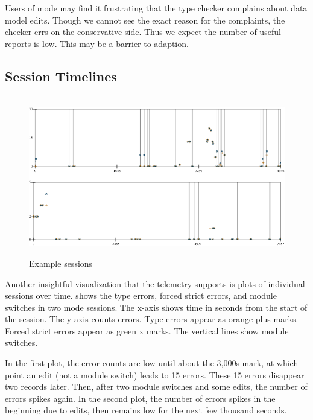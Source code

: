 \documentclass[english,submission,cleveref]{programming}
\begin{document}
Users of \mstrict{} mode may find it frustrating that the type checker complains
about data model edits.
Though we cannot see the exact reason for the complaints, the checker errs on
the conservative side.
Thus we expect the number of useful reports is low.
This may be a barrier to adaption.


\subsection{Session Timelines}

\begin{figure}[t]\centering

  \medskip{}
  \mstrict{}\\
  \includegraphics[width=\columnwidth]{img/timeline-strict.pdf}

  \caption{Example sessions}
  \label{f:indy-session}
\end{figure}

Another insightful visualization that the telemetry supports is plots of individual sessions
over time.
 shows the type errors, forced strict errors, and module switches
in two \mstrict{} mode sessions.
The x-axis shows time in seconds from the start of the session.
The y-axis counts errors.
Type errors appear as orange plus marks.
Forced strict errors appear as green x marks.
The vertical lines show module switches.

In the first plot, the error counts are low until about the 3,000s mark,
at which point an edit (not a module switch) leads to 15 errors.
These 15 errors disappear two records later.
Then, after two module switches and some edits, the number of errors spikes again.
In the second plot, the number of errors spikes in the beginning due to edits,
then remains low for the next few thousand seconds.
\end{document}
